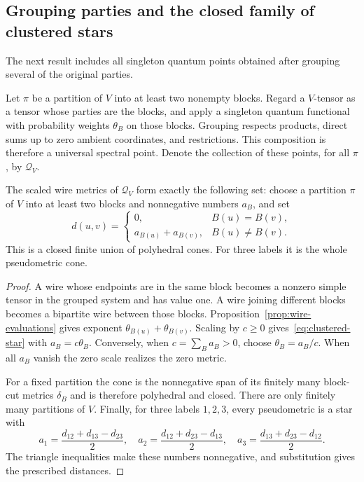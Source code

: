 \subsection{Grouping parties and the closed family of clustered stars}
The next result includes all singleton quantum points obtained after grouping several of the original parties.

Let $\pi$ be a partition of $V$ into at least two nonempty blocks.  Regard a $V$-tensor as a tensor whose parties are the blocks, and apply a singleton quantum functional with probability weights $\theta_B$ on those blocks.  Grouping respects products, direct sums up to zero ambient coordinates, and restrictions.  This composition is therefore a universal spectral point.  Denote the collection of these points, for all $\pi$, by $\mathcal Q_V$.

\begin{theorem}
\label{thm:grouped-stars}
The scaled wire metrics of $\mathcal Q_V$ form exactly the following set:
choose a partition $\pi$ of $V$ into at least two blocks and nonnegative numbers $a_B$, and set
\begin{equation}
 d(u,v)=\begin{cases}
 0,&B(u)=B(v),\\
 a_{B(u)}+a_{B(v)},&B(u)\ne B(v).
 \end{cases}
 \label{eq:clustered-star}
\end{equation}
This is a closed finite union of polyhedral cones.  For three labels it is the whole pseudometric cone.
\end{theorem}
\begin{proof}
A wire whose endpoints are in the same block becomes a nonzero simple tensor in the grouped system and has value one.  A wire joining different blocks becomes a bipartite wire between those blocks.  Proposition~\ref{prop:wire-evaluations} gives exponent $\theta_{B(u)}+\theta_{B(v)}$.  Scaling by $c\geq0$ gives~\eqref{eq:clustered-star} with $a_B=c\theta_B$.
Conversely, when $c=\sum_Ba_B>0$, choose $\theta_B=a_B/c$.  When all $a_B$ vanish the zero scale realizes the zero metric.

For a fixed partition the cone is the nonnegative span of its finitely many block-cut metrics $\delta_B$ and is therefore polyhedral and closed.  There are only finitely many partitions of $V$.  Finally, for three labels $1,2,3$, every pseudometric is a star with
\[
 a_1=\frac{d_{12}+d_{13}-d_{23}}2,\quad
 a_2=\frac{d_{12}+d_{23}-d_{13}}2,\quad
 a_3=\frac{d_{13}+d_{23}-d_{12}}2.
\]
The triangle inequalities make these numbers nonnegative, and substitution gives the prescribed distances.
\end{proof}

